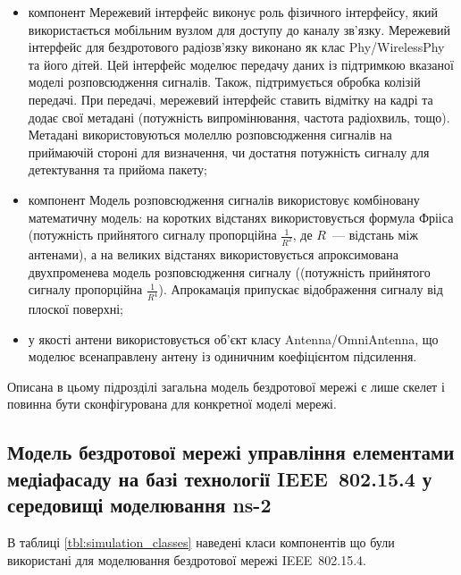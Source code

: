 \documentclass[a4paper,ukrainian,utf8,nocolumnsxix,floatsection,equationsection]{eskdtext}
\newcommand{\iee}[0]{IEEE~802.15.4\xspace}
\begin{document}
\begin{itemize}
	\item компонент Мережевий інтерфейс виконує роль фізичного інтерфейсу, який використається мобільним вузлом для доступу до каналу зв’язку. Мережевий інтерфейс для бездротового радіозв’язку виконано як клас Phy/WirelessPhy та його дітей. Цей інтерфейс моделює передачу даних із підтримкою вказаної моделі розповсюдження сигналів. Також, підтримується обробка колізій передачі. При передачі, мережевий інтерфейс ставить відмітку на кадрі та додає свої метадані (потужність випромінювання, частота радіохвиль, тощо). Метадані використовуються молеллю розповсюдження сигналів на приймаючій стороні для визначення, чи достатня потужність сигналу для детектування та прийома пакету;

	\item компонент Модель розповсюдження сигналів використовує комбіновану математичну модель: на коротких відстанях використовується формула Фрііса (потужність прийнятого сигналу пропорційна $\frac{1}{R^2}$, де $R$~--- відстань між антенами), а на великих відстанях використовується апроксимована двухпроменева модель розповсюдження сигналу ((потужність прийнятого сигналу пропорційна $\frac{1}{R^4}$). Апрокамація припускає відображення сигналу від плоскої поверхні;

	\item у якості антени використовується об’єкт класу Antenna/OmniAntenna, що моделює всенаправлену антену із одиничним коефіцієнтом підсилення. 
\end{itemize}

Описана в цьому підрозділі загальна модель бездротової мережі є лише скелет і повинна бути сконфігурована для конкретної моделі мережі.

\subsection{Модель бездротової мережі управління елементами медіафасаду на базі технології \iee у середовищі моделювання ns-2}
\label{sub:ns:ieee:network:model}

В таблиці \ref{tbl:simulation_classes} наведені класи компонентів що були використані для моделювання бездротової мережі \iee.
\end{document}
